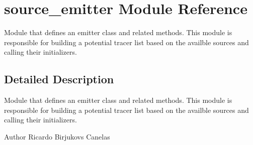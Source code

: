 \hypertarget{namespacesource__emitter}{}\section{source\+\_\+emitter Module Reference}
\label{namespacesource__emitter}


Module that defines an emitter class and related methods. This module is responsible for building a potential tracer list based on the availble sources and calling their initializers.  




\subsection{Detailed Description}
Module that defines an emitter class and related methods. This module is responsible for building a potential tracer list based on the availble sources and calling their initializers. 

\begin{DoxyAuthor}{Author}
Ricardo Birjukovs Canelas 
\end{DoxyAuthor}

